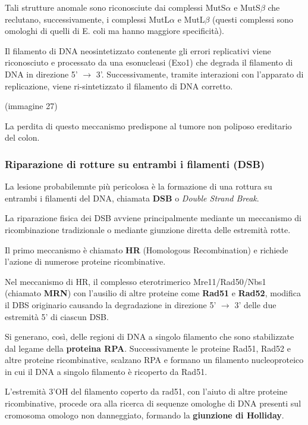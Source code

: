 \documentclass[]{article}
\begin{document}
Tali strutture anomale sono riconosciute dai complessi MutS\(\alpha\) e
MutS\(\beta\) che reclutano, successivamente, i complessi MutL\(\alpha\)
e MutL\(\beta\) (questi complessi sono omologhi di quelli di E. coli ma
hanno maggiore specificità).

Il filamento di DNA neosintetizzato contenente gli errori replicativi
viene riconosciuto e processato da una esonucleasi (Exo1) che degrada il
filamento di DNA in direzione 5' \(\rightarrow\) 3'. Successivamente,
tramite interazioni con l'apparato di replicazione, viene
ri-sintetizzato il filamento di DNA corretto.

(immagine 27)

La perdita di questo meccanismo predispone al tumore non poliposo
ereditario del colon.

\subsubsection{Riparazione di rotture su entrambi i filamenti
(DSB)}\label{riparazione-di-rotture-su-entrambi-i-filamenti-dsb}

La lesione probabilemnte più pericolosa è la formazione di una rottura
su entrambi i filamenti del DNA, chiamata \textbf{DSB} o \emph{Double
Strand Break}.

La riparazione fisica dei DSB avviene principalmente mediante un
meccanismo di ricombinazione tradizionale o mediante giunzione diretta
delle estremità rotte.

Il primo meccanismo è chiamato \textbf{HR} (Homologous Recombination) e
richiede l'azione di numerose proteine ricombinative.

Nel meccanismo di HR, il complesso eterotrimerico Mre11/Rad50/Nbs1
(chiamato \textbf{MRN}) con l'ausilio di altre proteine come
\textbf{Rad51} e \textbf{Rad52}, modifica il DBS originario causando la
degradazione in direzione 5' \(\rightarrow\) 3' delle due estremità 5'
di ciascun DSB.

Si generano, così, delle regioni di DNA a singolo filamento che sono
stabilizzate dal legame della \textbf{proteina RPA}. Successivamente le
proteine Rad51, Rad52 e altre proteine ricombinative, scalzano RPA e
formano un filamento nucleoproteico in cui il DNA a singolo filamento è
ricoperto da Rad51.

L'estremità 3'OH del filamento coperto da rad51, con l'aiuto di altre
proteine ricombinative, procede ora alla ricerca di sequenze omologhe di
DNA presenti sul cromosoma omologo non danneggiato, formando la
\textbf{giunzione di Holliday}.
\end{document}
